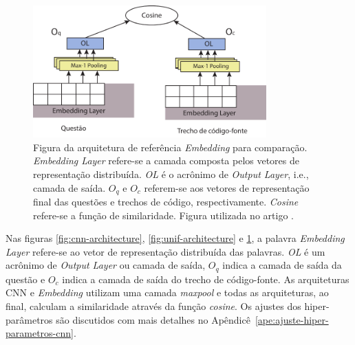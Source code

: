 \begin{figure}[h]
    \centering
    \includegraphics[width=0.8\textwidth]{figuras/cap-experimento/embedding-architecture.pdf}
    \caption{Figura da arquitetura de referência \textit{Embedding} para comparação. \emph{Embedding Layer} refere-se a camada composta pelos vetores de representação distribuída. \emph{OL} é o acrônimo de \emph{Output Layer}, i.e., camada de saída. $O_{q}$ e $O_{c}$ referem-se aos vetores de representação final das questões e trechos de código, respectivamente. \emph{Cosine} refere-se a função de similaridade. Figura utilizada no artigo \cite{marcelo-vem-2019}.}
    \label{fig:embedding-architecture}
\end{figure}
Nas figuras \ref{fig:cnn-architecture}, \ref{fig:unif-architecture} e \ref{fig:embedding-architecture}, a palavra \textit{Embedding Layer} refere-se ao vetor de representação distribuída das palavras. \emph{OL} é um acrônimo de \textit{Output Layer} ou camada de saída, $O_{q}$ indica a camada de saída da questão e $O_{c}$ indica a camada de saída do trecho de código-fonte. As arquiteturas CNN e \textit{Embedding} utilizam uma camada \textit{maxpool} e todas as arquiteturas, ao final, calculam a similaridade através da função \textit{cosine}. Os ajustes dos hiper-parâmetros são discutidos com mais detalhes no Apêndicê~\ref{ape:ajuste-hiper-parametros-cnn}.

